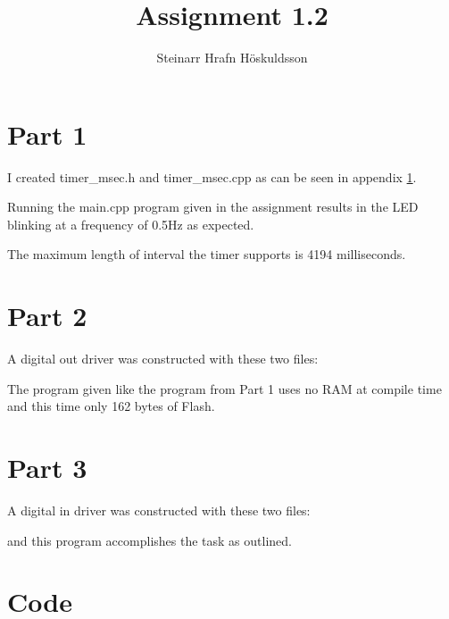 \documentclass{article}
\title{Assignment 1.2}
\author{Steinarr Hrafn Höskuldsson}
\begin{document}
\pagestyle{firststyle}
{\let\newpage\relax\maketitle}
\section*{Part 1}
I created timer\_msec.h and timer\_msec.cpp as can be seen in appendix \ref{appendix:code}. 

Running the main.cpp program given in the assignment results in the LED blinking at a frequency of 0.5Hz as expected. 

The maximum length of interval the timer supports is 4194 milliseconds.

\section*{Part 2}
A digital out driver was constructed with these two files:


The program given like the program from Part 1 uses no RAM at compile time and this time only 162 bytes of Flash.
\newpage
\section*{Part 3}
A digital in driver was constructed with these two files:

\newpage
and this program accomplishes the task as outlined.

\appendix
\section{Code}\label{appendix:code}





\end{document}
